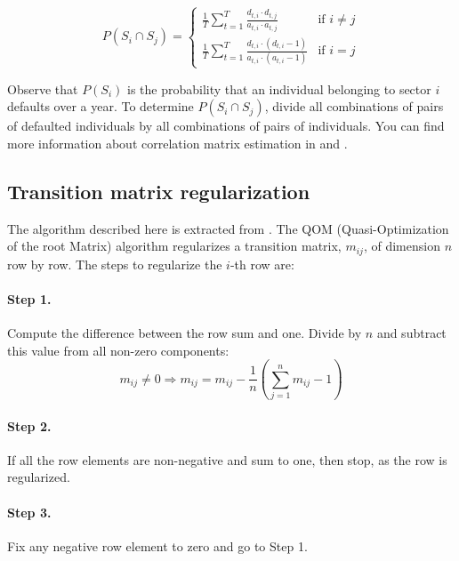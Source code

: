 \documentclass[a4paper,12pt,final]{article}
\begin{document}
\begin{displaymath}
P(S_i \cap S_j) = \left\{
\begin{array}{ll}
\frac{1}{T} \sum_{t=1}^{T} \frac{d_{t,i} \cdot d_{t,j}}{a_{t,i} \cdot a_{t,j}} & \textrm{if  } i \neq j \\
\frac{1}{T} \sum_{t=1}^{T} \frac{d_{t,i} \cdot (d_{t,i}-1)}{a_{t,i} \cdot (a_{t,i}-1)} & \textrm{if  } i = j
\end{array}
\right.
\end{displaymath}

Observe that $P(S_i)$ is the probability that an individual belonging to sector $i$
defaults over a year. To determine $P(S_i \cap S_j)$, divide all combinations of pairs 
of defaulted individuals by all combinations of pairs of individuals. You can find 
more information about correlation matrix estimation in \cite{correlations:ubs} and 
\cite{correlations:cmetrics}.

\subsection{Transition matrix regularization}
\label{ap:regularization}
The algorithm described here is extracted from \cite{trans:regularization}.
The QOM (Quasi-Optimization of the root Matrix) algorithm regularizes a 
transition matrix, $m_{ij}$, of dimension $n$ row by row. The steps to 
regularize the $i$-th row are:

\paragraph{Step 1.} Compute the difference between the row sum and one. 
Divide by $n$ and subtract this value from all non-zero components:
\begin{displaymath}
m_{ij} \ne 0 
\Longrightarrow 
m_{ij} = m_{ij} - \frac{1}{n} \left( \sum_{j=1}^{n} m_{ij} - 1\right)
\end{displaymath}

\paragraph{Step 2.} If all the row elements are non-negative and sum to one, 
then stop, as the row is regularized.

\paragraph{Step 3.} Fix any negative row element to zero and go to Step 1.
\newline
\end{document}

